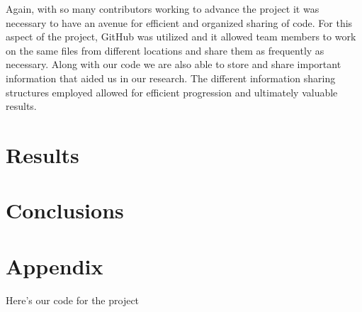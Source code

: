\documentclass[11pt]{article}
\begin{document}
\noindent Again, with so many contributors working to advance the project it was necessary to have an avenue for efficient and organized sharing of code. For this aspect of the project, GitHub was utilized and it allowed team members to work on the same files from different locations and share them as frequently as necessary. Along with our code we are also able to store and share important information that aided us in our research. The different information sharing structures employed allowed for efficient progression and ultimately valuable results. 






\section{Results}
  
\newpage





%


\section{Conclusions}



\newpage
\section{Appendix}
Here's our code for the project

\newpage


 

\newpage{}

\end{document}
